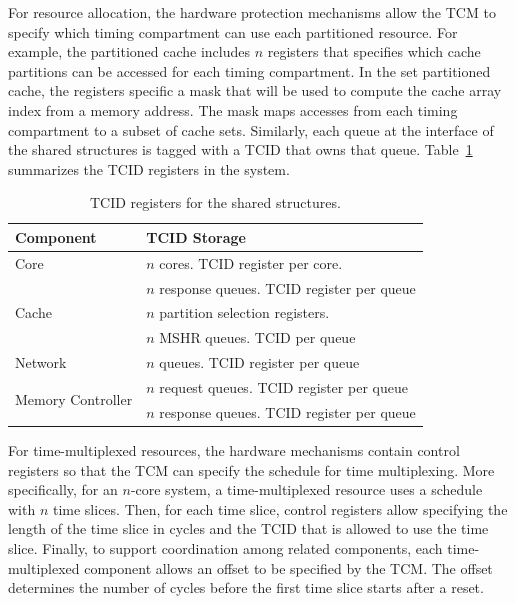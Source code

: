 For resource allocation, the hardware protection mechanisms allow the TCM to 
specify which timing compartment can use each partitioned resource.
For example, 
the partitioned cache includes $n$ registers that specifies which cache partitions 
can be accessed for each timing compartment. 
In the set partitioned cache, the registers specific a mask
that will be used to compute the cache array index from a memory address.
The mask maps accesses from each timing compartment to a subset of 
cache sets.
Similarly, each queue at the interface of the shared structures is tagged
with a TCID that owns that queue.
Table~\ref{table:tcid} summarizes the TCID registers in the system.

\begin{table}
\begin{center}
    \begin{footnotesize}
\begin{tabular}{l|l}
    \hline
    Component & TCID Storage \\
    \hline
    Core & $n$ cores. TCID register per core. \\
    \hline
    \multirow{3}{*}{Cache}
    & $n$ response queues. TCID register per queue \\
    & $n$ partition selection registers. \\
    & $n$ MSHR queues. TCID per queue\\
    \hline
    Network & $n$ queues. TCID register per queue\\
    \hline
    \multirow{2}{*}{Memory Controller}
    & $n$ request queues. TCID register per queue \\
    & $n$ response queues. TCID register per queue\\
    \hline
\end{tabular}
    \end{footnotesize}
    \caption{TCID registers for the shared structures.}
    \label{table:tcid}
\end{center}
\end{table}

For time-multiplexed resources, the hardware mechanisms contain control
registers so that the TCM can specify the schedule for time multiplexing.
More specifically, for an $n$-core system, a time-multiplexed resource
uses a schedule with $n$ time slices. Then, for each time slice, control
registers allow specifying the length of the time slice in cycles and
the TCID that is allowed to use the time slice. Finally, to support
coordination among related components, each time-multiplexed component
allows an offset to be specified by the TCM. The offset determines
the number of cycles before the first time slice starts after a reset.

